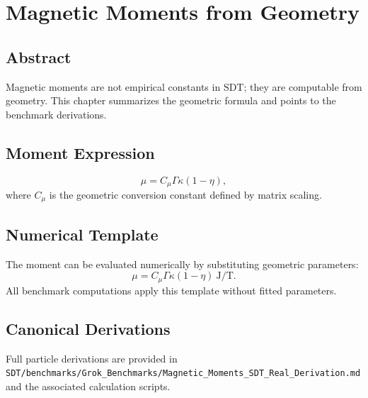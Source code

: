 \documentclass[12pt]{book}
\begin{document}
\chapter{Magnetic Moments from Geometry}

\section*{Abstract}
Magnetic moments are not empirical constants in SDT; they are computable from geometry. This chapter
summarizes the geometric formula and points to the benchmark derivations.

\section{Moment Expression}
\begin{equation}
\mu = C_\mu \Gamma \kappa (1-\eta),
\end{equation}
where $C_\mu$ is the geometric conversion constant defined by matrix scaling.

\section{Numerical Template}
The moment can be evaluated numerically by substituting geometric parameters:
\begin{equation}
\mu = C_\mu \Gamma \kappa (1-\eta)\ \text{J/T}.
\end{equation}
All benchmark computations apply this template without fitted parameters.

\section{Canonical Derivations}
Full particle derivations are provided in \texttt{SDT/benchmarks/Grok\_Benchmarks/Magnetic\_Moments\_SDT\_Real\_Derivation.md}
and the associated calculation scripts.
\end{document}
